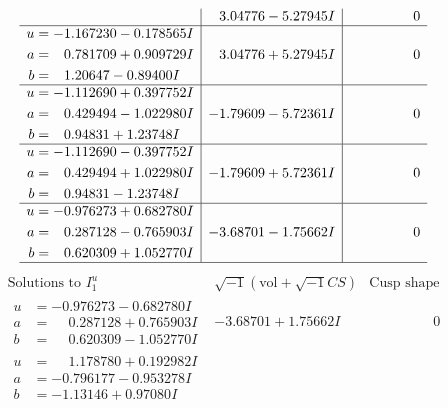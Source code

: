 \documentclass[1p]{elsarticle_modified}
\theoremstyle{definition}
\newcommand{\I}{\sqrt{-1}}
\begin{document}
$$\begin{array}{c|c|c}
 & \phantom{-}3.04776 - 5.27945 I & \phantom{-0.000000 } 0 \\ \hline\begin{aligned}
u &= -1.167230 - 0.178565 I \\
a &= \phantom{-}0.781709 + 0.909729 I \\
b &= \phantom{-}1.20647 - 0.89400 I\end{aligned}
 & \phantom{-}3.04776 + 5.27945 I & \phantom{-0.000000 } 0 \\ \hline\begin{aligned}
u &= -1.112690 + 0.397752 I \\
a &= \phantom{-}0.429494 - 1.022980 I \\
b &= \phantom{-}0.94831 + 1.23748 I\end{aligned}
 & -1.79609 - 5.72361 I & \phantom{-0.000000 } 0 \\ \hline\begin{aligned}
u &= -1.112690 - 0.397752 I \\
a &= \phantom{-}0.429494 + 1.022980 I \\
b &= \phantom{-}0.94831 - 1.23748 I\end{aligned}
 & -1.79609 + 5.72361 I & \phantom{-0.000000 } 0 \\ \hline\begin{aligned}
u &= -0.976273 + 0.682780 I \\
a &= \phantom{-}0.287128 - 0.765903 I \\
b &= \phantom{-}0.620309 + 1.052770 I\end{aligned}
 & -3.68701 - 1.75662 I & \phantom{-0.000000 } 0\\
 \hline 
 \end{array}$$\newpage$$\begin{array}{c|c|c}  
\text{Solutions to }I^u_{1}& \I (\text{vol} + \sqrt{-1}CS) & \text{Cusp shape}\\
 \hline 
\begin{aligned}
u &= -0.976273 - 0.682780 I \\
a &= \phantom{-}0.287128 + 0.765903 I \\
b &= \phantom{-}0.620309 - 1.052770 I\end{aligned}
 & -3.68701 + 1.75662 I & \phantom{-0.000000 } 0 \\ \hline\begin{aligned}
u &= \phantom{-}1.178780 + 0.192982 I \\
a &= -0.796177 - 0.953278 I \\
b &= -1.13146 + 0.97080 I\end{aligned}

\end{array}$$
\end{document}

